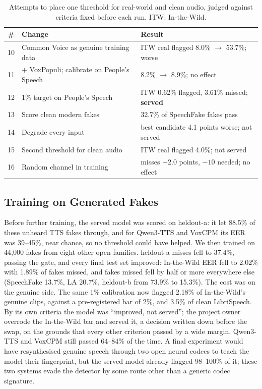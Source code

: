 \documentclass[journal]{IEEEtran}
\begin{document}
\begin{table}[!t]
\caption{Attempts to place one threshold for real-world and clean audio,
judged against criteria fixed before each run. ITW: In-the-Wild.}
\label{tab:thr}
\centering
\footnotesize
\begin{tabular}{@{}cL{3.0cm}L{3.5cm}@{}}
\toprule
\# & Change & Result \\
 & Common Voice as genuine training data & ITW real flagged 8.0\% $\to$ 53.7\%; worse \\
11 & + VoxPopuli; calibrate on People's Speech & 8.2\% $\to$ 8.9\%; no effect \\
12 & 1\% target on People's Speech & ITW 0.62\% flagged, 3.61\% missed; \textbf{served} \\
13 & Score clean modern fakes & 32.7\% of SpeechFake fakes pass \\
14 & Degrade every input & best candidate 4.1 points worse; not served \\
15 & Second threshold for clean audio & ITW real flagged 4.0\%; not served \\
16 & Random channel in training & misses $-2.0$ points, $-10$ needed; no effect \\
\bottomrule
\end{tabular}
\end{table}

\subsection{Training on Generated Fakes}
Before further training, the served model was scored on heldout-a: it let
88.5\% of these unheard TTS fakes through, and for Qwen3-TTS and VoxCPM its
EER was 39--45\%, near chance, so no threshold could have helped. We then
trained on 44{,}000 fakes from eight other open families. heldout-a misses fell
to 37.4\%, passing the gate, and every final test set improved: In-the-Wild
EER fell to 2.02\% with 1.89\% of fakes missed, and fakes missed fell by half
or more everywhere else (SpeechFake 13.7\%, LA 20.7\%, heldout-b from 73.9\%
to 15.3\%). The cost was on the genuine side. The same
1\% calibration now flagged 2.18\% of In-the-Wild's genuine clips, against a
pre-registered bar of 2\%, and 3.5\% of clean LibriSpeech. By its own criteria
the model was ``improved, not served''; the project owner overrode the
In-the-Wild bar and served it, a decision written down before the swap, on
the grounds that every other criterion passed by a wide margin. Qwen3-TTS and
VoxCPM still passed 64--84\% of the time. A final experiment would have
resynthesised genuine speech through two open neural codecs to teach the
model their fingerprint, but the served model already flagged 98--100\% of
it; these two systems evade the detector by some route other than a generic
codec signature.
\end{document}

